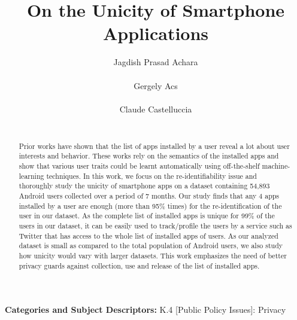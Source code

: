 \documentclass{acm_proc_article-sp}
\theoremstyle{plain}
\theoremstyle{plain}
\theoremstyle{plain}
\theoremstyle{plain}
\theoremstyle{plain}
\theoremstyle{plain}
\begin{document}
\sloppy

\title{On the Unicity of Smartphone Applications}


\author{
\alignauthor
Jagdish Prasad Achara\\
       \\
\alignauthor
Gergely Acs\\
       \\
\alignauthor 
Claude Castelluccia\\
       \\
}


\maketitle









\begin{abstract}
Prior works have shown that the list of apps installed by a user reveal a lot about user interests and behavior.
These works rely on the semantics of the installed apps and show that various user traits could be  learnt automatically using off-the-shelf machine-learning techniques. 
In this work, we focus on the re-identifiability issue and thoroughly study the unicity of smartphone apps on a dataset containing 54,893 Android users collected over a period of 7 months.
Our study finds that any 4 apps installed by a user are enough (more than 95\% times) for the re-identification of the user in our dataset.
As the complete list of installed apps is unique for 99\% of the users in our dataset, it can be easily used to track/profile the users by a service such as Twitter that has access to the whole list of installed apps of users.
As our analyzed dataset is small as compared to the total population of Android users, we also study how unicity would vary with larger datasets.
This work emphasizes the need of better privacy guards against collection, use and release of the list of installed apps.




\end{abstract}


\vspace{1mm}
\noindent
{\bf Categories and Subject Descriptors:} K.4 {[Public Policy Issues]}: {Privacy}
\end{document}
